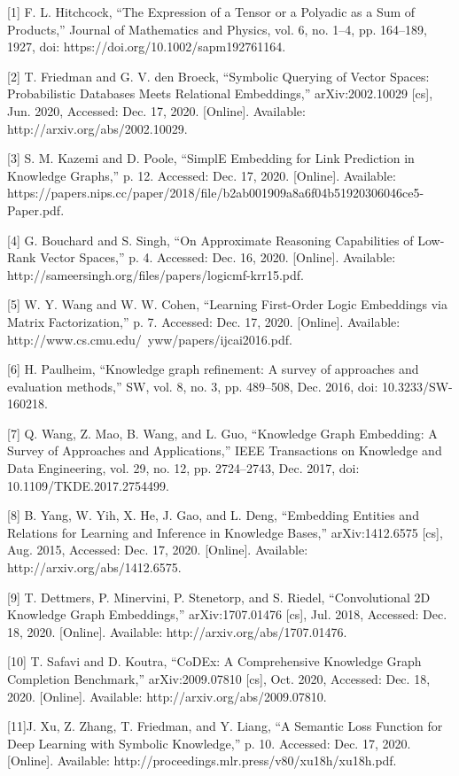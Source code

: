 \documentclass{article}
\begin{document}
[1] F. L. Hitchcock, “The Expression of a Tensor or a Polyadic as a Sum of Products,” Journal of Mathematics and Physics, vol. 6, no. 1–4, pp. 164–189, 1927, doi: https://doi.org/10.1002/sapm192761164.

[2] T. Friedman and G. V. den Broeck, “Symbolic Querying of Vector Spaces: Probabilistic Databases Meets Relational Embeddings,” arXiv:2002.10029 [cs], Jun. 2020, Accessed: Dec. 17, 2020. [Online]. Available: http://arxiv.org/abs/2002.10029.

[3] S. M. Kazemi and D. Poole, “SimplE Embedding for Link Prediction in Knowledge Graphs,” p. 12. Accessed: Dec. 17, 2020. [Online]. Available: https://papers.nips.cc/paper/2018/file/b2ab001909a8a6f04b51920306046ce5-Paper.pdf.

[4] G. Bouchard and S. Singh, “On Approximate Reasoning Capabilities of Low-Rank Vector Spaces,” p. 4. Accessed: Dec. 16, 2020. [Online]. Available: http://sameersingh.org/files/papers/logicmf-krr15.pdf.

[5] W. Y. Wang and W. W. Cohen, “Learning First-Order Logic Embeddings via Matrix Factorization,” p. 7. Accessed: Dec. 17, 2020. [Online]. Available: http://www.cs.cmu.edu/~yww/papers/ijcai2016.pdf.

[6] H. Paulheim, “Knowledge graph refinement: A survey of approaches and evaluation methods,” SW, vol. 8, no. 3, pp. 489–508, Dec. 2016, doi: 10.3233/SW-160218.

[7] Q. Wang, Z. Mao, B. Wang, and L. Guo, “Knowledge Graph Embedding: A Survey of Approaches and Applications,” IEEE Transactions on Knowledge and Data Engineering, vol. 29, no. 12, pp. 2724–2743, Dec. 2017, doi: 10.1109/TKDE.2017.2754499.

[8] B. Yang, W. Yih, X. He, J. Gao, and L. Deng, “Embedding Entities and Relations for Learning and Inference in Knowledge Bases,” arXiv:1412.6575 [cs], Aug. 2015, Accessed: Dec. 17, 2020. [Online]. Available: http://arxiv.org/abs/1412.6575.

[9] T. Dettmers, P. Minervini, P. Stenetorp, and S. Riedel, “Convolutional 2D Knowledge Graph Embeddings,” arXiv:1707.01476 [cs], Jul. 2018, Accessed: Dec. 18, 2020. [Online]. Available: http://arxiv.org/abs/1707.01476.

[10] T. Safavi and D. Koutra, “CoDEx: A Comprehensive Knowledge Graph Completion Benchmark,” arXiv:2009.07810 [cs], Oct. 2020, Accessed: Dec. 18, 2020. [Online]. Available: http://arxiv.org/abs/2009.07810.

[11]J. Xu, Z. Zhang, T. Friedman, and Y. Liang, “A Semantic Loss Function for Deep Learning with Symbolic Knowledge,” p. 10. Accessed: Dec. 17, 2020. [Online]. Available: http://proceedings.mlr.press/v80/xu18h/xu18h.pdf.
\end{document}
